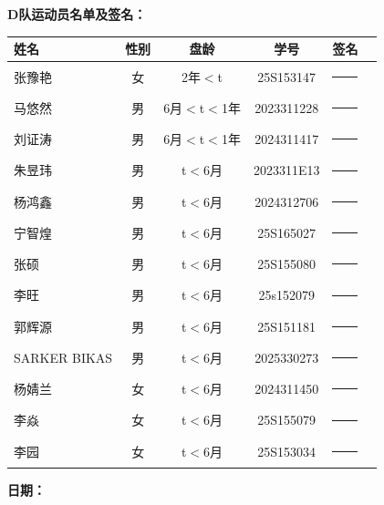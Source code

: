 \documentclass{article}
\begin{document}
\noindent \textbf{D队运动员名单及签名：} \\
\begin{center}
\small %
\renewcommand{\arraystretch}{1.8} %
\begin{tabular}{lccccl}
    \toprule
    \textbf{姓名} & \textbf{性别} & \textbf{盘龄} & \textbf{学号} & \textbf{签名} \\[3pt] %
    \midrule
    张豫艳 & 女 & 2年$<$t & 25S153147 & \rule{3cm}{0.4pt} \\
    马悠然 & 男 & 6月$<$t$<$1年 & 2023311228 & \rule{3cm}{0.4pt} \\
    刘证涛 & 男 & 6月$<$t$<$1年 & 2024311417 & \rule{3cm}{0.4pt} \\
    朱昱玮 & 男 & t$<$6月 & 2023311E13 & \rule{3cm}{0.4pt} \\
    杨鸿鑫 & 男 & t$<$6月 & 2024312706 & \rule{3cm}{0.4pt} \\
    宁智煌 & 男 & t$<$6月 & 25S165027 & \rule{3cm}{0.4pt} \\
    张硕 & 男 & t$<$6月 & 25S155080 & \rule{3cm}{0.4pt} \\
    李旺 & 男 & t$<$6月 & 25s152079 & \rule{3cm}{0.4pt} \\
    郭辉源 & 男 & t$<$6月 & 25S151181 & \rule{3cm}{0.4pt} \\
    SARKER BIKAS & 男 & t$<$6月 & 2025330273 & \rule{3cm}{0.4pt} \\
    杨婧兰 & 女 & t$<$6月 & 2024311450 & \rule{3cm}{0.4pt} \\
    李焱 & 女 & t$<$6月 & 25S155079 & \rule{3cm}{0.4pt} \\
    李园 & 女 & t$<$6月 & 25S153034 & \rule{3cm}{0.4pt} \\
    \bottomrule
\end{tabular}
\end{center}

\vspace{0.5cm} %
\noindent \textbf{日期：}
\end{document}
